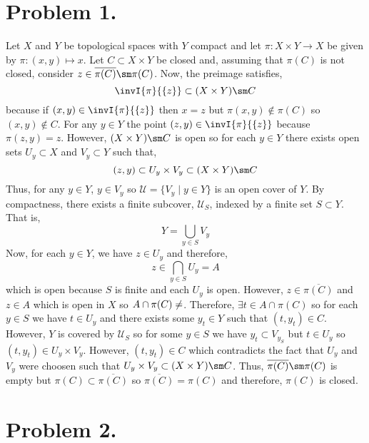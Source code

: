 \documentclass[12pt]{extarticle}
\begin{document}
 
\section*{Problem 1.}
Let $X$ and $Y$ be topological spaces with $Y$ compact and let $\pi : X \times Y \to X$ be given by $\pi : (x, y) \mapsto x$. Let $C \subset X \times Y$ be closed and, assuming that $\pi(C)$ is not closed, consider $z \in \overline{\pi(C)}\sm \pi(C)$. Now, the preimage satisfies, 
\[\invI{\pi}{\{z\}} \subset (X \times Y) \sm C\]
because if $(x, y) \in \invI{\pi}{\{z\}}$ then $x = z$ but $\pi(x, y) \notin \pi(C)$ so $(x, y) \notin C$. For any $y \in Y$ the point $(z, y) \in \invI{\pi}{\{z\}}$ because $\pi(z, y) = z$. However, $(X \times Y) \sm C$ is open so for each $y \in Y$ there exists open sets $U_y \subset X$ and $V_y \subset Y$ such that, \[(z, y) \subset U_y \times V_y \subset (X \times Y) \sm C\]
Thus, for any $y \in Y$, $y \in V_y$ so $\mathcal{U} = \{V_y \mid y \in Y\}$ is an open cover of $Y$. By compactness, there exists a finite subcover, $\mathcal{U}_S$, indexed by a finite set $S \subset Y$. That is, \[ Y = \bigcup_{y \in S} V_y\]
Now, for each $y \in Y$, we have $z \in U_y$ and therefore, 
\[z \in \bigcap\limits_{y \in S} U_y = A\]     
which is open because $S$ is finite and each $U_y$ is open. However, $z \in \overline{\pi(C)}$ and $z \in A$ which is open in $X$ so $A \cap \pi(C) \neq \empty$. Therefore, $\exists t \in A \cap \pi(C)$ so for each $y \in S$ we have $t \in U_y$ and there exists some $y_t \in Y$ such that $(t, y_t) \in C$. However, $Y$ is covered by $\mathcal{U}_S$ so for some $y \in S$ we have $y_t \subset V_{y_S}$ but $t \in U_{y}$ so $(t, y_t) \in U_{y} \times V_{y}$. However, $(t, y_t) \in C$ which contradicts the fact that $U_y$ and $V_y$ were choosen such that $U_y \times V_y \subset (X \times Y) \sm C$. Thus, $ \overline{\pi(C)}\sm \pi(C)$ is empty but $\pi(C) \subset \overline{\pi(C)}$ so $\overline{\pi(C)} = \pi(C)$ and therefore, $\pi(C)$ is closed.   

\section*{Problem 2.}
\end{document}
